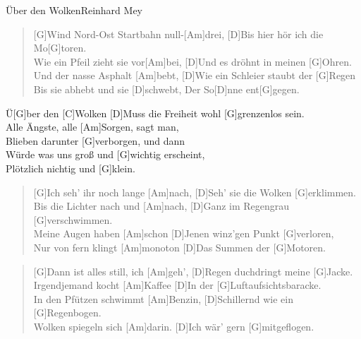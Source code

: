 \begin{song}{Über den Wolken}{Reinhard Mey}

    \begin{verse}
        [G]Wind Nord-Ost Startbahn null-[Am]drei,
        [D]Bis hier hör ich die Mo[G]toren. \\
        [G]Wie ein Pfeil zieht sie vor[Am]bei,
        [D]Und es dröhnt in meinen [G]Ohren. \\
        Und der nasse Asphalt [Am]bebt,
        [D]Wie ein Schleier staubt der [G]Regen \\
        [Am]Bis sie abhebt und sie [D]schwebt,
        Der So[D]nne ent[G]gegen.
    \end{verse}

    \begin{chorus}
        Ü[G]ber den [C]Wolken
        [D]Muss die Freiheit wohl [G]grenzenlos sein. \\
        [Em]Alle Ängste, alle [Am]Sorgen, sagt man, \\
        [D]Blieben darunter [G]verborgen, und dann \\
        [C]Würde was uns groß und [G]wichtig erscheint, \\
        [D]Plötzlich nichtig und [G]klein.
    \end{chorus}

    \begin{verse}
        [G]Ich seh' ihr noch lange [Am]nach, 
        [D]Seh' sie die Wolken [G]erklimmen. \\
        Bis die Lichter nach und [Am]nach, 
        [D]Ganz im Regengrau [G]verschwimmen. \\
        Meine Augen haben [Am]schon 
        [D]Jenen winz'gen Punkt [G]verloren, \\
        Nur von fern klingt [Am]monoton 
        [D]Das Summen der [G]Motoren.
    \end{verse}


    \begin{verse}
        [G]Dann ist alles still, ich [Am]geh', 
        [D]Regen duchdringt meine [G]Jacke. \\
        Irgendjemand kocht [Am]Kaffee 
        [D]In der [G]Luftaufsichtsbaracke. \\
        In den Pfützen schwimmt [Am]Benzin, 
        [D]Schillernd wie ein [G]Regenbogen. \\
        Wolken spiegeln sich [Am]darin. 
        [D]Ich wär' gern [G]mitgeflogen.
    \end{verse}


\end{song}
